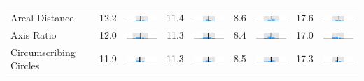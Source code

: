 \begin{table}
\begin{tabular}{l rm{7em} rm{7em} rm{7em} rm{7em}}
\\ \hline \\ 
Areal Distance         &  12.2 &       \includegraphics[width=7em]{mini_hist/TX_senate_2008_dist_a} &  11.4 &       \includegraphics[width=7em]{mini_hist/TX_senate_2012_dist_a} &   8.6 &       \includegraphics[width=7em]{mini_hist/TX_senate_2014_dist_a} &  17.6 &       \includegraphics[width=7em]{mini_hist/TX_senate_2018_dist_a} \\
Axis Ratio             &  12.0 &   \includegraphics[width=7em]{mini_hist/TX_senate_2008_axis_ratio} &  11.3 &   \includegraphics[width=7em]{mini_hist/TX_senate_2012_axis_ratio} &   8.4 &   \includegraphics[width=7em]{mini_hist/TX_senate_2014_axis_ratio} &  17.0 &   \includegraphics[width=7em]{mini_hist/TX_senate_2018_axis_ratio} \\
Circumscribing Circles &  11.9 &        \includegraphics[width=7em]{mini_hist/TX_senate_2008_reock} &  11.3 &        \includegraphics[width=7em]{mini_hist/TX_senate_2012_reock} &   8.5 &        \includegraphics[width=7em]{mini_hist/TX_senate_2014_reock} &  17.3 &        \includegraphics[width=7em]{mini_hist/TX_senate_2018_reock} \\

\end{tabular}
\end{table}
